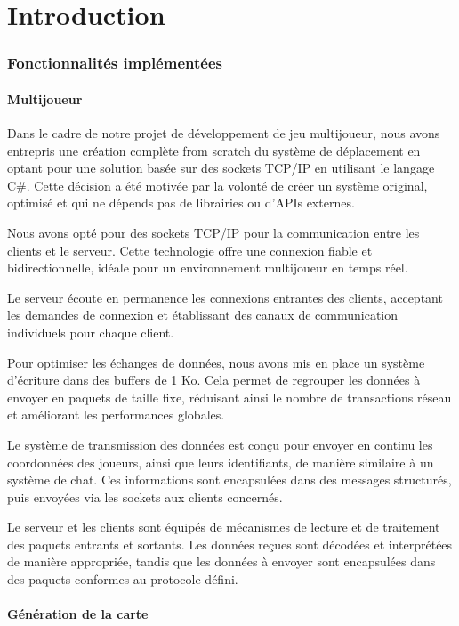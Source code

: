 \documentclass[
	article,			%
	11pt,				%
	oneside,			%
	a4paper,			%
	chapter=TITLE,
	french,			%
	sumario=tradicional
	]{base_nt}
\begin{document}
\part{Introduction}
\section{Fonctionnalités implémentées}

\subsection{Multijoueur}

Dans le cadre de notre projet de développement de jeu multijoueur, nous avons entrepris une création complète from scratch du système de déplacement en optant pour une solution basée sur des sockets TCP/IP en utilisant le langage C\#. Cette décision a été motivée par la volonté de créer un système original, optimisé et qui ne dépends pas de librairies ou d'APIs externes.

Nous avons opté pour des sockets TCP/IP pour la communication entre les clients et le serveur. Cette technologie offre une connexion fiable et bidirectionnelle, idéale pour un environnement multijoueur en temps réel.

Le serveur écoute en permanence les connexions entrantes des clients, acceptant les demandes de connexion et établissant des canaux de communication individuels pour chaque client.

Pour optimiser les échanges de données, nous avons mis en place un système d'écriture dans des buffers de 1 Ko. Cela permet de regrouper les données à envoyer en paquets de taille fixe, réduisant ainsi le nombre de transactions réseau et améliorant les performances globales.

Le système de transmission des données est conçu pour envoyer en continu les coordonnées des joueurs, ainsi que leurs identifiants, de manière similaire à un système de chat. Ces informations sont encapsulées dans des messages structurés, puis envoyées via les sockets aux clients concernés.

Le serveur et les clients sont équipés de mécanismes de lecture et de traitement des paquets entrants et sortants. Les données reçues sont décodées et interprétées de manière appropriée, tandis que les données à envoyer sont encapsulées dans des paquets conformes au protocole défini.

\newpage

\subsection{Génération de la carte}
\end{document}
